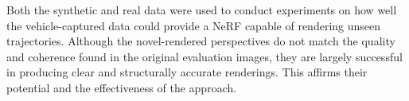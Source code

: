 Both the synthetic and real data were used to conduct experiments on how well the vehicle-captured data could provide a NeRF capable of rendering unseen trajectories. Although the novel-rendered perspectives do not match the quality and coherence found in the original evaluation images, they are largely successful in producing clear and structurally accurate renderings. This affirms their potential and the effectiveness of the approach.


\begin{comment}
Initially, this pipeline was applied to synthetic data gathered from a controlled virtual environment, CARLA, which facilitated the creation of a performance baseline. The establishment of this baseline underscored the significance of various parameters for the quality of the data capture and subsequent NeRF. The parameters included camera setup, segment length, dataset size, image resolution, and vehicle speed.

Subsequent experimentation built upon this baseline, revealing important findings. Optimized camera poses consistently produced superior renderings despite the presence of noise, with shorter segments proving particularly effective. In contrast, non-optimized poses only excelled with perfect camera poses. Furthermore, our experiments demonstrated that COLMAP pre-processing overwhelmingly outperformed joint camera pose optimization, even in high-noise situations, arguing for its consideration despite an upfront time investment.

Progressing into the exploration of large-scale NeRF approaches, we implemented a naive variant. The promising results of this implementation were evident across multiple scenes, with image synthesis displaying sharper details and a notable improvement in overall visual quality.

Applying the acquired knowledge from the previous experiments, a dataparser for the NAPLab vehicle was created, allowing the end-to-end pipeline to be used on real data. Despite lower-quality image synthesis due to the uncontrollable environment, many of the findings from the controllable, virtual environment held true. Although optimizing camera poses performed better than not optimizing them, COLMAP outperformed joint camera optimization overall. Additionally, the naive Block-NeRF implementation performed better than a single NeRF.
\end{comment}

